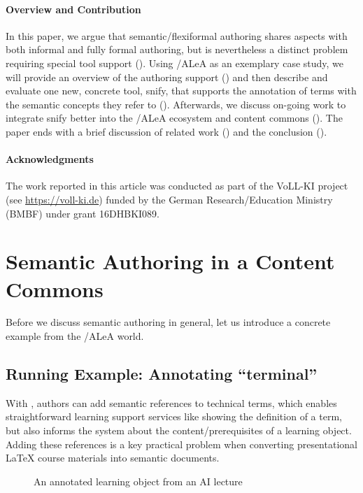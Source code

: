 \documentclass[runningheads]{llncs}
\newcommand\ALeA{\textsf{ALeA}\xspace}
\newcommand\snify{\textsf{snify}\xspace}
\begin{document}
\paragraph{Overview and Contribution}
In this paper, we argue that semantic/flexiformal authoring shares aspects with both informal and fully formal authoring,
but is nevertheless a distinct problem requiring special tool support ().
Using \sTeX/\ALeA as an exemplary case study,
we will provide an overview of the authoring support ()
and then describe and evaluate one new, concrete tool, \snify, that supports the annotation
of terms with the semantic concepts they refer to ().
Afterwards, we discuss on-going work to integrate \snify better
into the \sTeX/\ALeA ecosystem and content commons ().
The paper ends with a brief discussion of related work () and the conclusion ().


\paragraph{Acknowledgments}
The work reported in this article was conducted as part of the VoLL-KI project (see
\url{https://voll-ki.de}) funded by the German Research/Education Ministry (BMBF) under
grant 16DHBKI089.

\section{Semantic Authoring in a Content Commons}\label{sec:semauth}

Before we discuss semantic authoring in general, let us introduce a concrete example from the \sTeX/\ALeA world.

\subsection{Running Example: Annotating ``terminal''}
With \sTeX, authors can add semantic references to technical terms,
which enables straightforward learning support services like
showing the definition of a term, but also informs the system
about the content/prerequisites of a learning object.
Adding these references is a key practical problem when converting presentational {\LaTeX}
course materials into semantic documents.

\begin{figure}[h]\centering
  \caption{An annotated learning object from an AI lecture}\label{fig:lo}
\end{figure}
\end{document}
